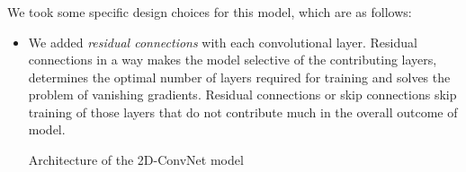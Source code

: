 \documentclass[runningheads]{llncs}
\begin{document}
\subsubsection{} We took some specific design choices for this model, which are as follows:
\begin{itemize}
 \item We added \emph{residual connections} with each convolutional layer. Residual connections in a way makes the model selective of the contributing layers, determines the optimal number of layers required for training and solves the problem of vanishing gradients. Residual connections or skip connections skip training of those layers that do not contribute much in the overall outcome of model.

\begin{table}[]
\centering
 \setlength{\belowcaptionskip}{-5pt}
 \caption{Architecture of the 2D-ConvNet model}
 

\end{table}
\end{itemize}
\end{document}

